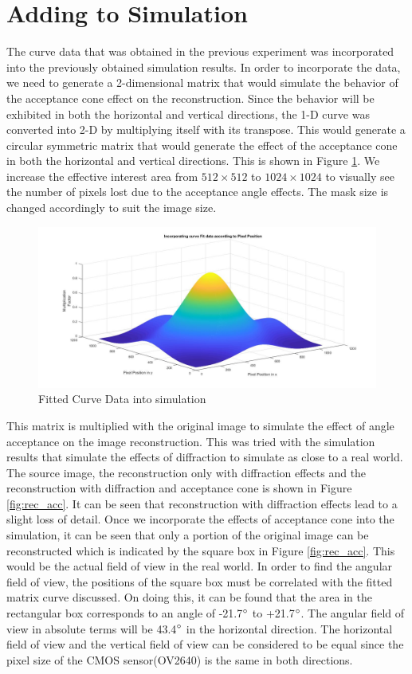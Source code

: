 \section{Adding to Simulation}
The curve data that was obtained in the previous experiment was incorporated into the previously obtained simulation results. In order to incorporate the data, we need to generate a 2-dimensional matrix that would simulate the behavior of the acceptance cone effect on the reconstruction. Since the behavior will be exhibited in both the horizontal and vertical directions, the 1-D curve was converted into 2-D by multiplying itself with its transpose. This would generate a circular symmetric matrix that would generate the effect of the acceptance cone in both the horizontal and vertical directions. This is shown in Figure \ref{fig:curve_sim}. We increase the effective interest area from $512 \times 512$ to $1024 \times 1024$ to visually see the number of pixels lost due to the acceptance angle effects. The mask size is changed accordingly to suit the image size.   
\begin{figure}[!h]
\centering
\includegraphics[width = \linewidth]{pics/AcceptanceConeCurveFit}
\caption{Fitted Curve Data into simulation}
\label{fig:curve_sim}
\end{figure}
This matrix is multiplied with the original image to simulate the effect of angle acceptance on the image reconstruction. This was tried with the simulation results that simulate the effects of diffraction to simulate as close to a real world. The source image, the reconstruction only with diffraction effects and the reconstruction with diffraction and acceptance cone is shown in Figure \ref{fig:rec_acc}. It can be seen that reconstruction with diffraction effects lead to a slight loss of detail. Once we incorporate the effects of acceptance cone into the simulation, it can be seen that only a portion of the original image can be reconstructed which is indicated by the square box in Figure \ref{fig:rec_acc}. 
This would be the actual field of view in the real world.  In order to find the angular field of view, the positions of the square box must be correlated with the fitted matrix curve discussed. On doing this, it can be found that the area in the rectangular box corresponds to an angle of -21.7$\degree$ to +21.7$\degree$. The angular field of view in absolute terms will be 43.4$\degree$ in the horizontal direction. The horizontal field of view and the vertical field of view can be considered to be equal since the pixel size of the CMOS sensor(OV2640) is the same in both directions.

